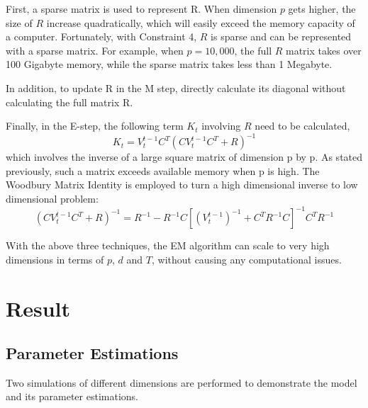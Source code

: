\documentclass[fleqn]{article}
\newcommand{\T}{T}
\begin{document}
First, a sparse matrix is used to represent R. When dimension $p$ gets higher, the size of $R$ increase quadratically, which will easily exceed the memory capacity of a computer.  Fortunately, with Constraint 4, $R$ is sparse and can be represented with a sparse matrix. For example, when $p=10,000$, the full $R$ matrix takes over 100 Gigabyte memory, while the sparse matrix takes less than 1 Megabyte.

In addition, to update R in the M step, directly calculate its diagonal without calculating the full matrix R.

Finally, in the E-step, the following term $K_t$ involving $R$ need to be calculated,
\[
K_t=V_t^{t-1}C^{\T}(CV_t^{t-1}C^{\T}+R)^{-1}
\]
which involves the inverse of a large square matrix of dimension p by p. As stated previously, such a matrix exceeds available memory when p is high. The Woodbury Matrix Identity is employed to turn a high dimensional inverse to low dimensional problem:
\[
(CV_t^{t-1}C^{\T}+R)^{-1} = R^{-1} - R^{-1}C[(V_t^{t-1})^{-1} + C^{\T}R^{-1}C]^{-1}C^{\T}R^{-1}
\]

With the above three techniques, the EM algorithm can scale to very high dimensions in terms of $p$, $d$ and $T$, without causing any computational issues.



\section{Result}
\subsection{Parameter Estimations}
\label{sec:lowdsim}
Two simulations of different dimensions are performed to demonstrate the model and its parameter estimations.
\end{document}
